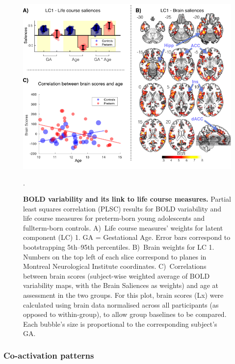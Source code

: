 \begin{figure}[h!] 
\centering\includegraphics[width=1\linewidth]{images/Ch3/Fig2_PLS_var_LC1.png}
\caption{\textbf{BOLD variability and its link to life course measures.} Partial least squares correlation (PLSC) results for BOLD variability and life course measures for preterm-born young adolescents and fullterm-born controls.  A)~Life course measures' weights for latent component (LC) 1. GA = Gestational Age. Error bars correspond to bootstrapping 5th--95th percentiles. B)~Brain weights for LC 1. Numbers on the top left of each slice correspond to planes in Montreal Neurological Institute coordinates. C)~Correlations between brain scores (subject-wise weighted average of BOLD variability maps, with the Brain Saliences as weights) and age at assessment in the two groups. For this plot, brain scores (Lx) were calculated using brain data normalised across all participants (as opposed to within-group), to allow group baselines to be compared. Each bubble's size is proportional to the corresponding subject's GA. %
}. \label{fig:PLS_var} \vspace{-0.5cm}
\end{figure}



\subsubsection{Co-activation patterns}

